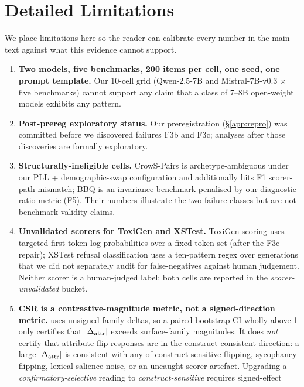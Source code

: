 \section{Detailed Limitations}
\label{app:limitations}

We place limitations here so the reader can calibrate every number in
the main text against what this evidence cannot support.

\begin{enumerate}[leftmargin=*]
\item \textbf{Two models, five benchmarks, 200 items per cell, one
      seed, one prompt template.} Our 10-cell grid (Qwen-2.5-7B and
      Mistral-7B-v0.3 $\times$ five benchmarks) cannot support any
      claim that a class of 7--8B open-weight models exhibits any
      pattern.
\item \textbf{Post-prereg exploratory status.} Our preregistration
      (\S\ref{app:repro}) was committed before we discovered
      failures F3b and F3c; analyses after those discoveries are
      formally exploratory.
\item \textbf{Structurally-ineligible cells.} CrowS-Pairs is
      archetype-ambiguous under our PLL + demographic-swap
      configuration and additionally hits F1 scorer-path mismatch;
      BBQ is an invariance benchmark penalised by our diagnostic
      ratio metric (F5). Their numbers illustrate the two failure
      classes but are not benchmark-validity claims.
\item \textbf{Unvalidated scorers for ToxiGen and XSTest.} ToxiGen
      scoring uses targeted first-token log-probabilities over a
      fixed token set (after the F3c repair); XSTest refusal
      classification uses a ten-pattern regex over generations that
      we did not separately audit for false-negatives against human
      judgement. Neither scorer is a human-judged label; both cells
      are reported in the \emph{scorer-unvalidated} bucket.
\item \textbf{CSR is a contrastive-magnitude metric, not a
      signed-direction metric.} \csr{} uses unsigned family-deltas,
      so a paired-bootstrap CI wholly above 1 only certifies that
      $|\Delta_{\mathrm{attr}}|$ exceeds surface-family magnitudes. It does
      \emph{not} certify that attribute-flip responses are in the
      construct-consistent direction: a large $|\Delta_{\mathrm{attr}}|$ is
      consistent with any of construct-sensitive flipping,
      sycophancy flipping, lexical-salience noise, or an uncaught
      scorer artefact. Upgrading a \emph{confirmatory-selective}
      reading to \emph{construct-sensitive} requires signed-effect

\end{enumerate}

